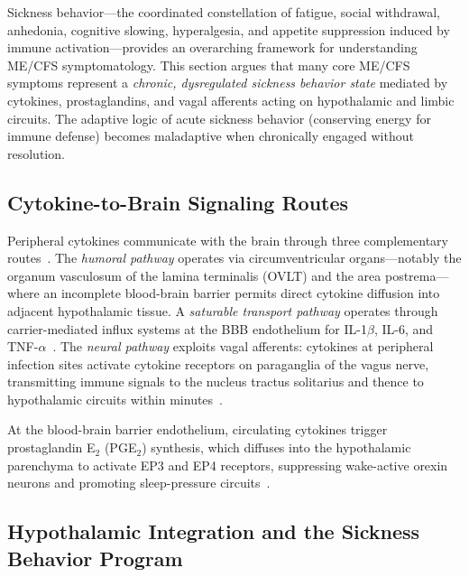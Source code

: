 Sickness behavior---the coordinated constellation of fatigue, social withdrawal, anhedonia, cognitive slowing, hyperalgesia, and appetite suppression induced by immune activation---provides an overarching framework for understanding ME/CFS symptomatology. This section argues that many core ME/CFS symptoms represent a \emph{chronic, dysregulated sickness behavior state} mediated by cytokines, prostaglandins, and vagal afferents acting on hypothalamic and limbic circuits. The adaptive logic of acute sickness behavior (conserving energy for immune defense) becomes maladaptive when chronically engaged without resolution.

\subsection{Cytokine-to-Brain Signaling Routes}

Peripheral cytokines communicate with the brain through three complementary routes~\cite{Dantzer2000neural, McCusker2013}. The \emph{humoral pathway} operates via circumventricular organs---notably the organum vasculosum of the lamina terminalis (OVLT) and the area postrema---where an incomplete blood-brain barrier permits direct cytokine diffusion into adjacent hypothalamic tissue. A \emph{saturable transport pathway} operates through carrier-mediated influx systems at the BBB endothelium for IL-1$\beta$, IL-6, and TNF-$\alpha$~\cite{McCusker2013}. The \emph{neural pathway} exploits vagal afferents: cytokines at peripheral infection sites activate cytokine receptors on paraganglia of the vagus nerve, transmitting immune signals to the nucleus tractus solitarius and thence to hypothalamic circuits within minutes~\cite{Dantzer2000neural, Huerta2025vagal}.

At the blood-brain barrier endothelium, circulating cytokines trigger prostaglandin E$_2$ (PGE$_2$) synthesis, which diffuses into the hypothalamic parenchyma to activate EP3 and EP4 receptors, suppressing wake-active orexin neurons and promoting sleep-pressure circuits~\cite{Matsumura2004endothelial, Marty2008NTS}.

\subsection{Hypothalamic Integration and the Sickness Behavior Program}

